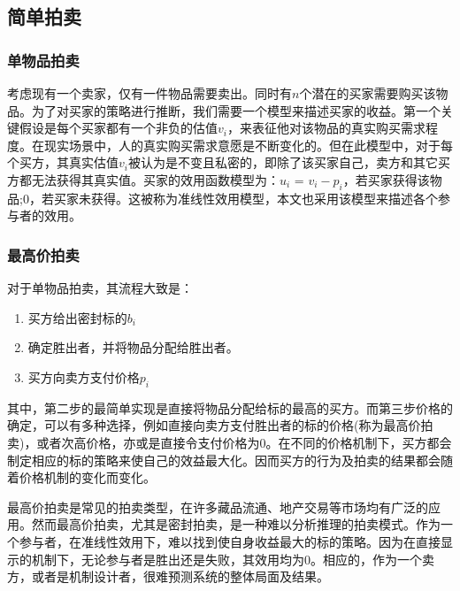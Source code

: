 \documentclass[promaster]{thesis-uestc}
\begin{document}
\subsection{简单拍卖}
\subsubsection{单物品拍卖}
考虑现有一个卖家，仅有一件物品需要卖出。同时有$n$个潜在的买家需要购买该物品。为了对买家的策略进行推断，我们需要一个模型来描述买家的收益。第一个关键假设是每个买家都有一个非负的估值$v_i$，来表征他对该物品的真实购买需求程度。在现实场景中，人的真实购买需求意愿是不断变化的。但在此模型中，对于每个买方，其真实估值$v_i$被认为是不变且私密的，即除了该买家自己，卖方和其它买方都无法获得其真实值。买家的效用函数模型为：$u_i$ = $v_i-p_i$，若买家获得该物品;$0$，若买家未获得。这被称为准线性效用模型，本文也采用该模型来描述各个参与者的效用。
\subsubsection{最高价拍卖}
对于单物品拍卖，其流程大致是：

\begin{enumerate}
    \item 买方给出密封标的$b_i$
    \item 确定胜出者，并将物品分配给胜出者。
    \item 买方向卖方支付价格$p_i$
\end{enumerate} 

其中，第二步的最简单实现是直接将物品分配给标的最高的买方。而第三步价格的确定，可以有多种选择，例如直接向卖方支付胜出者的标的价格(称为最高价拍卖)，或者次高价格，亦或是直接令支付价格为0。在不同的价格机制下，买方都会制定相应的标的策略来使自己的效益最大化。因而买方的行为及拍卖的结果都会随着价格机制的变化而变化。

最高价拍卖是常见的拍卖类型，在许多藏品流通、地产交易等市场均有广泛的应用。然而最高价拍卖，尤其是密封拍卖，是一种难以分析推理的拍卖模式。作为一个参与者，在准线性效用下，难以找到使自身收益最大的标的策略。因为在直接显示的机制下，无论参与者是胜出还是失败，其效用均为0。相应的，作为一个卖方，或者是机制设计者，很难预测系统的整体局面及结果。
\end{document}
